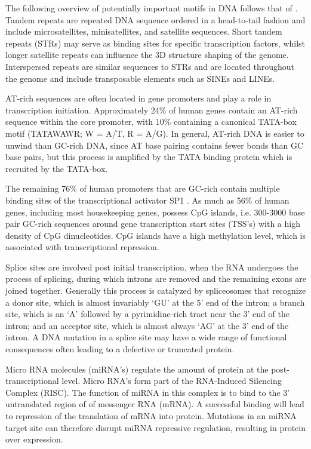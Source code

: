 \documentclass[12pt]{article}
\begin{document}
The following overview of potentially important motifs in DNA follows that of \citet{boeva2016analysis}. Tandem repeats are repeated DNA sequence ordered in a head-to-tail fashion and include microsatellites, minisatellites, and satellite sequences. Short tandem repeats (STRs) may serve as binding sites for specific transcription factors, whilst longer satellite repeats can influence the 3D structure shaping of the genome. Interspersed repeats are similar sequences to STRs and are located throughout the genome and include transposable elements such as SINEs and LINEs. 

AT-rich sequences are often located in gene promoters and play a role in transcription initiation. Approximately 24\% of human genes contain an AT-rich sequence within the core promoter, with 10\% containing a canonical TATA-box motif (TATAWAWR; W = A/T, R = A/G). In general, AT-rich DNA is easier to unwind than GC-rich DNA, since AT base pairing contains fewer bonds than GC base pairs, but this process is amplified by the TATA binding protein which is recruited by the TATA-box. 

The remaining 76\% of human promoters that are GC-rich contain multiple binding sites of the transcriptional activator SP1 \citep{yang2007prevalence}. As much as 56\% of human genes, including most housekeeping genes, possess CpG islands, i.e. 300-3000 base pair GC-rich sequences around gene transcription start sites (TSS's) with a high density of CpG dinucleotides. CpG islands have a high methylation level, which is associated with transcriptional repression. 

Splice sites are involved post initial transcription, when the RNA undergoes the process of splicing, during which introns are removed and the remaining exons are joined together. Generally this process is catalyzed by spliceosomes that recognize a donor site, which is almost invariably `GU' at the 5' end of the intron; a branch site, which is an `A' followed by a pyrimidine-rich tract near the 3' end of the intron; and an acceptor site, which is almost always `AG' at the 3' end of the intron. A DNA mutation in a splice site may have a wide range of functional consequences often leading to a defective or truncated protein.  

Micro RNA molecules (miRNA's) regulate the amount of protein at the post-transcriptional level. Micro RNA's form part of the RNA-Induced Silencing Complex (RISC). The function of miRNA in this complex is to bind to the 3' untranslated region of of messenger RNA (mRNA). A successful binding will lead to repression of the translation of mRNA into protein. Mutations in an miRNA target site can therefore disrupt miRNA repressive regulation, resulting in protein over expression.
\end{document}
